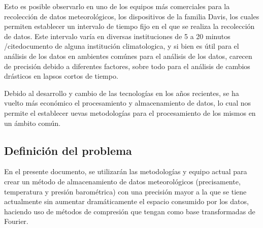 Esto es posible observarlo en uno de los equipos más comerciales para la recolección de datos meteorológicos, los dispositivos de la familia Davis, los cuales permiten establecer un intervalo de tiempo fijo en el que se realiza la recolección de datos. Este intervalo varía en diversas instituciones de 5 a 20 minutos /cite{documento de alguna institución climatologica}, y si bien es útil para el análisis de los datos en ambientes comúnes para el análisis de los datos, carecen de precisión debido a diferentes factores, sobre todo para el análisis de cambios drásticos en lapsos cortos de tiempo.

Debido al desarrollo y cambio de las tecnologías en los años recientes, se ha vuelto más económico el procesamiento y almacenamiento de datos, lo cual nos permite el establecer uevas metodologías para el procesamiento de los mismos en un ámbito común.

\subsection{Definición del problema}

En el presente documento, se utilizarán las metodologías y equipo actual para crear un método de almacenamiento de datos meteorológicos (precisamente, temperatura y presión barométrica) con una precisión mayor a la que se tiene actualmente sin aumentar dramáticamente el espacio consumido por los datos, haciendo uso de métodos de compresión que tengan como base transformadas de Fourier.
